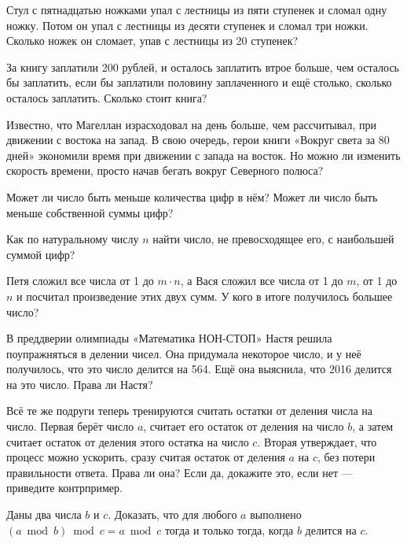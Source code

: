 \begin{itemize}
\itA Стул с пятнадцатью ножками упал с лестницы из пяти ступенек и сломал одну ножку. Потом он упал с лестницы из десяти ступенек и сломал три ножки. Сколько ножек он сломает, упав с лестницы из 20 ступенек?

\itB За книгу заплатили 200 рублей, и осталось заплатить втрое больше, чем осталось бы заплатить, если бы заплатили половину заплаченного и ещё столько, сколько осталось заплатить. Сколько стоит книга?

\itC Известно, что Магеллан израсходовал на день больше, чем рассчитывал, при движении с востока на запад. В свою очередь, герои книги «Вокруг света за 80 дней» экономили время при движении с запада на восток. Но можно ли изменить скорость времени, просто начав бегать вокруг Северного полюса?
\end{itemize}

\begin{itemize}
\itA Может ли число быть меньше количества цифр в нём? Может ли число быть меньше собственной суммы цифр?

\itB Как по натуральному числу $n$ найти число, не превосходящее его, с наибольшей суммой цифр?

\itC Петя сложил все числа от 1 до $m \cdot n$, а Вася сложил все числа от 1 до $m$, от 1 до $n$ и посчитал произведение этих двух сумм. У кого в итоге получилось большее число?
\end{itemize}

\begin{itemize}
\itA В преддверии олимпиады «Математика НОН-СТОП» Настя решила поупражняться в делении чисел. Она придумала некоторое число, и у неё получилось, что это число делится на 564. Ещё она выяснила, что 2016 делится на это число. Права ли Настя?

\itB Всё те же подруги теперь тренируются считать остатки от деления числа на число. Первая берёт число $a$, считает его остаток от деления на число $b$, а затем считает остаток от деления этого остатка на число $c$. Вторая утверждает, что процесс можно ускорить, сразу считая остаток от деления $a$ на $c$, без потери правильности ответа. Права ли она? Если да, докажите это, если нет — приведите контрпример.

\itC Даны два числа $b$ и $c$. Доказать, что для любого $a$ выполнено $(a \bmod b) \bmod c = a \bmod c$ тогда и только тогда, когда $b$ делится на $c$.
\end{itemize}

